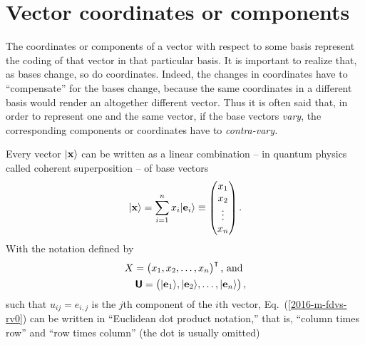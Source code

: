 \section{Vector coordinates or components}
The coordinates or components of a vector with respect to some basis
represent the coding of that vector in that particular basis.
It is important to realize that, as bases change, so do coordinates.
Indeed, the changes in coordinates have to ``compensate'' for the bases change,
because the same coordinates in a different basis would render an altogether different
vector.
Thus it is often said that, in order to represent one and the same vector,
if the base vectors {\em vary}, the corresponding components or coordinates have to {\em contra-vary.}


Every vector $\vert {\bf x} \rangle $
can be written as a linear combination -- in quantum physics called
{coherent superposition}
-- of  base vectors
\begin{equation}
\vert {\bf x} \rangle =  \sum_{i=1}^n x_i \vert {\bf e}_i \rangle
\equiv
\begin{pmatrix}x_1\\x_2\\ \vdots \\ x_n\end{pmatrix}.
\label{2016-m-fdvs-rv0}
\end{equation}
With the notation
defined by
\begin{equation}
\begin{split} X = \begin{pmatrix}
x_1, x_2, \ldots , x_n
\end{pmatrix}^\intercal
\textrm{, and }
\\
\textsf{\textbf{U}} =
\begin{pmatrix} \vert {\bf e}_1\rangle ,\vert {\bf e}_2 \rangle ,  \ldots , \vert {\bf e}_n\rangle \end{pmatrix}
,
\label{2016-m-fdvs-not}
\end{split}
\end{equation}
such that  $u_{ij} = e_{i,j}$ is the $j$th component of the $i$th vector,
Eq.~(\ref{2016-m-fdvs-rv0}) can be written
in ``Euclidean dot product notation,''
that is,
``column times row''
and
``row times column'' (the dot is usually omitted)
